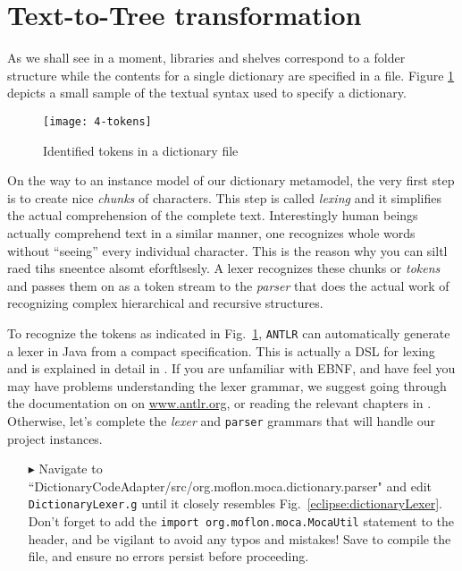 \newpage
\section{Text-to-Tree transformation}
\genHeader

As we shall see in a moment, libraries and shelves correspond to a folder structure while the contents for a single dictionary are specified in a file.
Figure \ref{fig:moca-4-Tokens} depicts a small sample of the textual syntax used to specify a dictionary. 

\begin{figure}[!htbp]
\begin{center}
 \texttt{[image: 4-tokens]}
  \caption{Identified tokens in a dictionary file \update}
  \label{fig:moca-4-Tokens}
\end{center}
\end{figure}

On the way to an instance model of our dictionary metamodel, the very first step is to create nice \emph{chunks} of characters. This step is called
\emph{lexing} and it simplifies the actual comprehension of the complete text. Interestingly human beings actually comprehend text in a similar manner, one
recognizes whole words without ``seeing'' every individual character. This is the reason why you can siltl raed tihs sneentce alsomt eforftlsesly. A lexer
recognizes these chunks or \emph{tokens} and passes them on as a token stream to the \emph{parser} that does the actual work of recognizing complex
hierarchical and recursive structures.
   
To recognize the tokens as indicated in Fig.~\ref{fig:moca-4-Tokens}, \texttt{ANTLR} can automatically generate a lexer in Java from a compact specification.
This is actually a DSL for lexing and is explained in detail in \cite{ANTLR}. If you are unfamiliar with EBNF, and have feel you may have problems understanding
the lexer grammar, we suggest going through the documentation on on \url{www.antlr.org}, or reading the relevant chapters in \cite{ANTLR}. Otherwise, let's
complete the \emph{lexer} and \texttt{parser} grammars that will handle our project instances.

\begin{itemize}
  
\item[$\blacktriangleright$] Navigate to ``DictionaryCodeAdapter/src/org.moflon.moca.dictionary.parser" and edit \texttt{DictionaryLexer.g} until it closely
resembles Fig.~\ref{eclipse:dictionaryLexer}. Don't forget to add the \texttt{import org.moflon.moca.MocaUtil} statement to the header, and be vigilant to avoid
any typos and mistakes! Save to compile the file, and ensure no errors persist before proceeding.

\end{itemize}
\newpage

